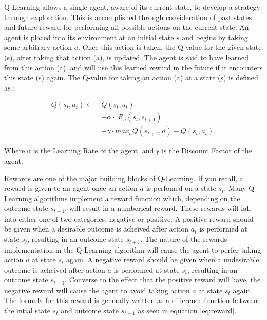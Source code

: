 \documentclass[times, 10pt,twocolumn]{article}
\begin{document}
Q-Learning allows a single agent, aware of its current state, to develop a strategy through exploration. This is accomplished through consideration of past states and future reward for performing all possible actions on the current state. An agent is placed into its environment at an initial state $s$ and begins by taking some arbitrary action $a$. Once this action is taken, the Q-value for the given state (s), after taking that action (a), is updated. The agent is said to have learned from this action (a), and will use this learned reward in the future if it encounters this state (s) again. The Q-value for taking an action (a) at a state (s) is defined as \cite{ex1}:

\begin{equation}
\begin{split}
Q(s_t, a_t) \gets &Q(s_t, a_t) \\
                  &+ \alpha \cdot [R_a(s_t, s_{t+1}) \\
                  &+ \gamma \cdot max_aQ(s_{t+1}, a) - Q(s_t, a_t)]
\end{split}
\end{equation}

Where α is the Learning Rate of the agent, and γ is the Discount Factor of the agent.


Rewards are one of the major building blocks of Q-Learning.  If you recall, a reward is given to an agent once an action $a$ is perfomed on a state $s_t$.  Many Q-Learning algorithms implement a reward function which, depending on the outcome state $s_{t+1}$, will result in a numberical reward.  These rewards will fall into either one of two categories, negative or positive.  A positive reward should be given when a desirable outcome is acheived after action $a_t$ is performed at state $s_t$, resulting in an outcome state $s_{t+1}$.  The nature of the rewards implementation in the Q-Learning algorithm will cause the agent to perfer taking action $a$ at state $s_t$ again.  A negative reward should be given when a undesirable outcome is acheived after action $a$ is performed at state $s_t$, resulting in an outcome state $s_{t+1}$.  Converse to the effect that the positive reward will have, the negative reward will cause the agent to avoid taking action $a$ at state $s_t$ again.  The formula for this reward is generally written as a difference function between the intial state $s_t$ and outcome state $s_{t+1}$ as seen in equation \ref{eq:reward}.
\end{document}
